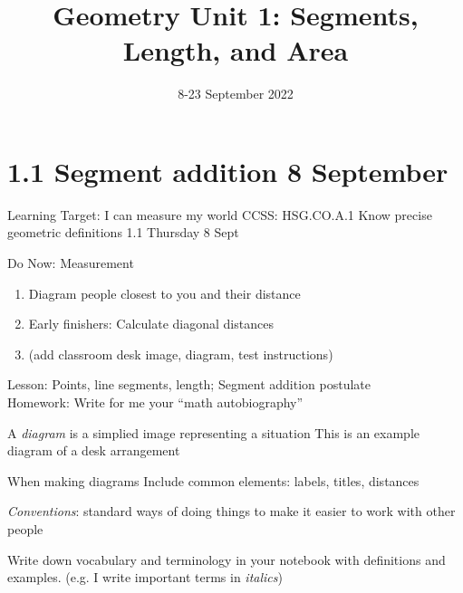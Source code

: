 

\title{Geometry Unit 1: Segments, Length, and Area}
\date{8-23 September 2022}


\frame{\titlepage}

\section[Outline]{}
\frame{\tableofcontents}

\section{1.1 Segment addition \hfill 8 September}
\begin{frame}{Learning Target: I can measure my world}
  {CCSS: HSG.CO.A.1 Know precise geometric definitions \hfill \alert{1.1 Thursday 8 Sept}}
  \begin{block}{Do Now: Measurement}
    \begin{enumerate}
        \item Diagram people closest to you and their distance
        \item Early finishers: Calculate diagonal distances
        \item (add classroom desk image, diagram, test instructions)
    \end{enumerate}
    \end{block}
    Lesson: Points, line segments, length; Segment addition postulate \\[0.25cm]
    Homework: Write for me your ``math autobiography''
\end{frame}

\begin{frame}{A \emph{diagram} is a simplied image representing a situation}
  {This is an example diagram of a desk arrangement}
  \begin{block}{When making diagrams}
    Include common elements: labels, titles, distances \par
    \emph{Conventions}: standard ways of doing things to make it easier to work with other people
  \end{block} \vspace{1cm}
  Write down vocabulary and terminology in your notebook with definitions and examples. (e.g. I write important terms in \emph{italics})
\end{frame}

